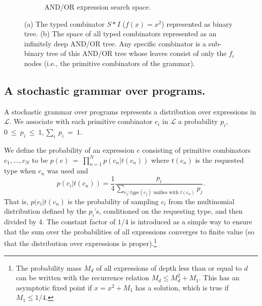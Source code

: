 \documentclass{article}
\begin{document}
\begin{figure}
\begin{subfigure}[After]{0.4\linewidth}
    \caption{AND/OR expression search space. }
    \label{fig:andor}
    \end{subfigure}
  \caption{(a) The typed combinator $S * I$ ($f(x)=x^2$) represented as
    binary tree. (b) The space of all typed combinators represented as an
    infinitely deep AND/OR tree. Any specific combinator is a
    sub-binary tree of this AND/OR tree whose leaves consist of only
    the $f_i$ nodes (i.e., the primitive combinators of the grammar).}

\end{figure}

\subsection{A stochastic grammar over programs.}
\label{sec:stochgrammar}
A stochastic grammar over programs represents a distribution over
expressions in $\mathcal{L}$. We associate with each primitive
combinator $c_i$ in $\mathcal{L}$ a probability $p_i$,
$0~\leq~p_i~\leq~1, \sum_i~p_i~=~1 $.

We define the probability of an expression $e$ consisting of primitive
combinators $c_1, \dots, c_N$ to be $p(e)~=~\prod_{n=1}^N p(c_n |
t(c_n))$ where $t(c_n)$ is the requested type when $c_n$ was used and
\[
p(c_i | t(c_n)) =    \frac{1}{4}\frac{p_i}{\sum_{c_j :
    type(c_j) \text{ unifies with } t(c_n)} p_j}.
\]
That is, $p(c_i | t(c_n)$ is the probability of sampling $c_i$ from
the multinomial distribution defined by the $p_i$'s, conditioned on
the requesting type, and then divided by 4. The constant factor of
$1/4$ is introduced as a simple way to ensure that the sum over the
probabilities of all expressions converges to finite value (so that
the distribution over expressions is proper).\footnote{The probability
  mass $M_d$ of all expressions of depth less than or equal to $d$ can
  be written with the recurrence relation $M_d \leq M_d^2 + M_1$. This
  has an asymptotic fixed point if $x = x^2 + M_1$ has a solution,
  which is true if $M_1 \leq 1/4$.}
\end{document}
